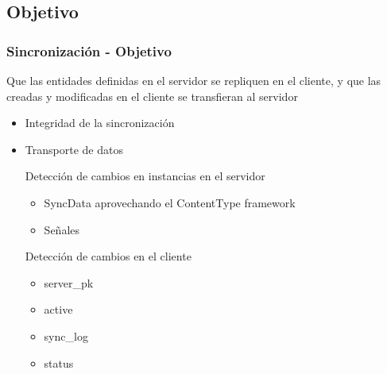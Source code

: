 \documentclass{beamer}
\begin{document}
\subsection{Objetivo}
\begin{frame}
    \frametitle{Sincronización - Objetivo}
    \par {
    	Que las entidades definidas en el servidor se repliquen en el cliente, y
    	que las creadas y modificadas en el cliente se transfieran al servidor
    }
    \pause
    \begin{itemize}
        \item{Integridad de la sincronización}
		\item{Transporte de datos}
		\begin{item}
          \par{Detección de cambios en instancias en el servidor}
		  \begin{itemize}
            \item{SyncData aprovechando el ContentType framework}
            \item{Señales}
          \end{itemize}
		\end{item}
        \begin{item}
          \par{Detección de cambios en el cliente}
          \begin{itemize}
                \item{server\_pk}
                \item{active}
                \item{sync\_log}
                \item{status}
          \end{itemize}
        \end{item}
    \end{itemize}
\end{frame}
\end{document}
